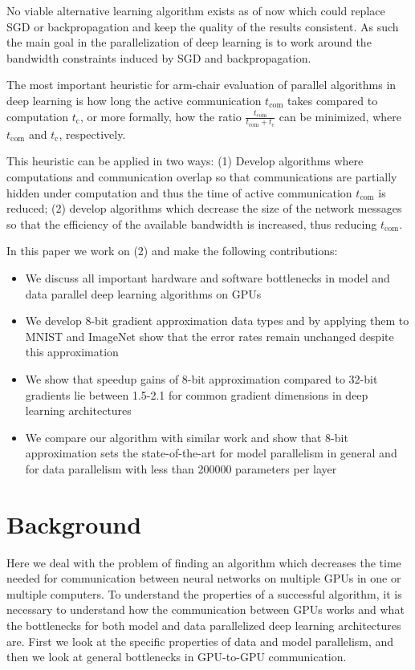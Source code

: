 \documentclass{article} %
\begin{document}
No viable alternative learning algorithm exists as of now which could replace SGD or backpropagation and keep the quality of the results consistent. As such the main goal in the parallelization of deep learning is to work around the bandwidth constraints induced by SGD and backpropagation. 

The most important heuristic for arm-chair evaluation of parallel algorithms in deep learning is how long the active communication $t_{\mbox{com}}$ takes compared to computation $t_{\mbox{c}}$, or more formally, how the ratio $\frac{t_{\mbox{com}}}{t_{\mbox{com}}+t_{\mbox{c}}}$ can be minimized, where $t_{\mbox{com}}$ and $t_{\mbox{c}}$, respectively. 

This heuristic can be applied in two ways: (1) Develop algorithms where computations and communication overlap so that communications are partially hidden under computation and thus the time of active communication $t_{\mbox{com}}$ is reduced; (2) develop algorithms which decrease the size of the network messages so that the efficiency of the available bandwidth is increased, thus reducing $t_{\mbox{com}}$.

In this paper we work on (2) and make the following contributions: 
 \begin{itemize}
 	\item We discuss all important hardware and software bottlenecks in model and data parallel deep learning algorithms on GPUs
 	\item We develop 8-bit gradient approximation data types and by applying them to MNIST and ImageNet show that the error rates remain unchanged despite this approximation
 	\item We show that speedup gains of 8-bit approximation compared to 32-bit gradients lie between 1.5-2.1 for common gradient dimensions in deep learning architectures
 	\item We compare our algorithm with similar work and show that 8-bit approximation sets the state-of-the-art for model parallelism in general and for data parallelism with less than 200000 parameters per layer
 \end{itemize}
\section{Background}

Here we deal with the problem of finding an algorithm which decreases the time needed for communication between neural networks on multiple GPUs in one or multiple computers. To understand the properties of a successful algorithm, it is necessary to understand how the communication between GPUs works and what the bottlenecks for both model and data parallelized deep learning architectures are. First we look at the specific properties of data and model parallelism, and then we look at general bottlenecks in GPU-to-GPU communication.
\end{document}
